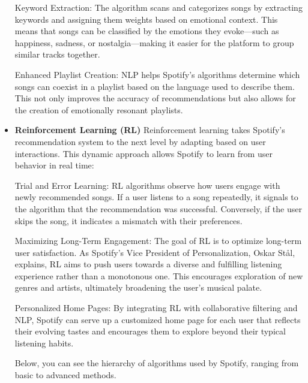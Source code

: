 \documentclass[12pt,a4paper]{article}
\begin{document}
\begin{itemize}
Keyword Extraction: The algorithm scans and categorizes songs by extracting keywords and assigning them weights based on emotional context. This means that songs can be classified by the emotions they evoke—such as happiness, sadness, or nostalgia—making it easier for the platform to group similar tracks together.

Enhanced Playlist Creation: NLP helps Spotify’s algorithms determine which songs can coexist in a playlist based on the language used to describe them. This not only improves the accuracy of recommendations but also allows for the creation of emotionally resonant playlists\citep{key}.

 \item \textbf{Reinforcement Learning (RL)}
Reinforcement learning takes Spotify’s recommendation system to the next level by adapting based on user interactions. This dynamic approach allows Spotify to learn from user behavior in real time:

Trial and Error Learning: RL algorithms observe how users engage with newly recommended songs. If a user listens to a song repeatedly, it signals to the algorithm that the recommendation was successful. Conversely, if the user skips the song, it indicates a mismatch with their preferences\citep{spotifys}.

Maximizing Long-Term Engagement: The goal of RL is to optimize long-term user satisfaction. As Spotify's Vice President of Personalization, Oskar Stål, explains, RL aims to push users towards a diverse and fulfilling listening experience rather than a monotonous one. This encourages exploration of new genres and artists, ultimately broadening the user's musical palate\citep{key}.

Personalized Home Pages: By integrating RL with collaborative filtering and NLP, Spotify can serve up a customized home page for each user that reflects their evolving tastes and encourages them to explore beyond their typical listening habits\citep{roma}.

Below, you can see the hierarchy of algorithms used by Spotify, ranging from basic to advanced methods.

\end{itemize}
\end{document}
